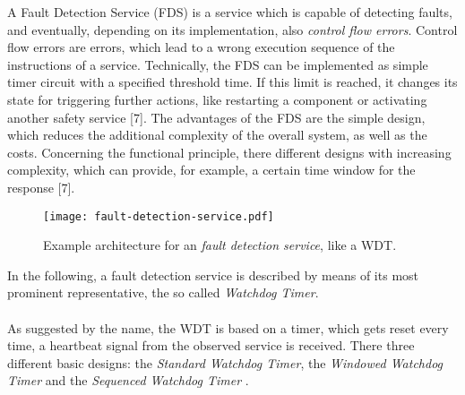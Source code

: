 A Fault Detection Service (FDS) is a service which is capable of detecting faults, and eventually, depending on its implementation, also \emph{control flow errors}. Control flow errors are errors, which lead to a wrong execution sequence of the instructions of a service.
Technically, the FDS can be implemented as simple timer circuit with a specified threshold time. If this limit is reached, it changes its state for triggering further actions, like restarting a component or activating another safety service [7].
The advantages of the FDS are the simple design, which reduces the additional complexity of the overall system, as well as the costs. Concerning the functional principle, there different designs with increasing complexity, which can provide, for example, a certain time window for the response [7].


\begin{figure}[!htbp]
\centering
\texttt{[image: fault-detection-service.pdf]}
\caption{Example architecture for an \emph{fault detection service}, like a WDT.}
\label{fig:fault-detection-service}
\end{figure}

In the following, a fault detection service is described by means of its most prominent representative, the so called \emph{Watchdog Timer}.
\\
\\
As suggested by the name, the WDT is based on a timer, which gets reset every time, a heartbeat signal from the observed service is received. There three different basic designs: the \emph{Standard Watchdog Timer}, the \emph{Windowed Watchdog Timer} and the \emph{Sequenced Watchdog Timer} \cite{elattar2007}.


